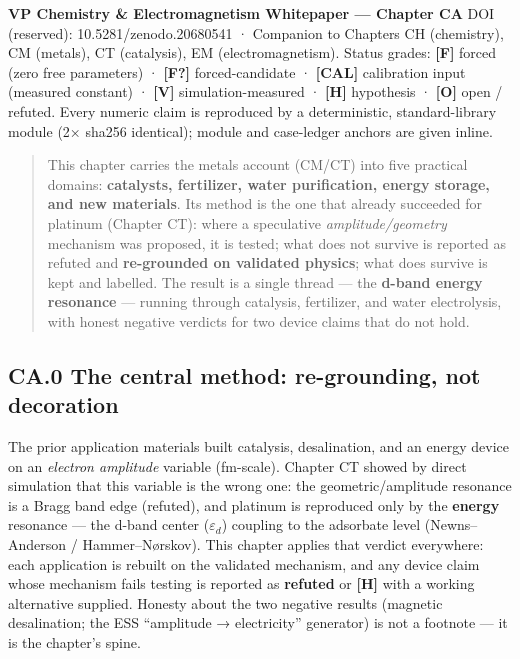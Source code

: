 \documentclass[
  10pt,
]{article}
\begin{document}
\textbf{VP Chemistry \& Electromagnetism Whitepaper --- Chapter CA} DOI
(reserved): 10.5281/zenodo.20680541 · Companion to Chapters CH
(chemistry), CM (metals), CT (catalysis), EM (electromagnetism). Status
grades: \textbf{{[}F{]}} forced (zero free parameters) ·
\textbf{{[}F?{]}} forced-candidate · \textbf{{[}CAL{]}} calibration
input (measured constant) · \textbf{{[}V{]}} simulation-measured ·
\textbf{{[}H{]}} hypothesis · \textbf{{[}O{]}} open / refuted. Every
numeric claim is reproduced by a deterministic, standard-library module
(2× sha256 identical); module and case-ledger anchors are given inline.

\begin{quote}
This chapter carries the metals account (CM/CT) into five practical
domains: \textbf{catalysts, fertilizer, water purification, energy
storage, and new materials}. Its method is the one that already
succeeded for platinum (Chapter CT): where a speculative
\emph{amplitude/geometry} mechanism was proposed, it is tested; what
does not survive is reported as refuted and \textbf{re-grounded on
validated physics}; what does survive is kept and labelled. The result
is a single thread --- the \textbf{d-band energy resonance} --- running
through catalysis, fertilizer, and water electrolysis, with honest
negative verdicts for two device claims that do not hold.
\end{quote}

\hypertarget{ca.0-the-central-method-re-grounding-not-decoration}{%
\subsection{CA.0 The central method: re-grounding, not
decoration}\label{ca.0-the-central-method-re-grounding-not-decoration}}

The prior application materials built catalysis, desalination, and an
energy device on an \emph{electron amplitude} variable (fm-scale).
Chapter CT showed by direct simulation that this variable is the wrong
one: the geometric/amplitude resonance is a Bragg band edge (refuted),
and platinum is reproduced only by the \textbf{energy} resonance --- the
d-band center (\(\varepsilon_d\)) coupling to the adsorbate level
(Newns--Anderson / Hammer--Nørskov). This chapter applies that verdict
everywhere: each application is rebuilt on the validated mechanism, and
any device claim whose mechanism fails testing is reported as
\textbf{refuted} or \textbf{{[}H{]}} with a working alternative
supplied. Honesty about the two negative results (magnetic desalination;
the ESS ``amplitude → electricity'' generator) is not a footnote --- it
is the chapter's spine.
\end{document}
